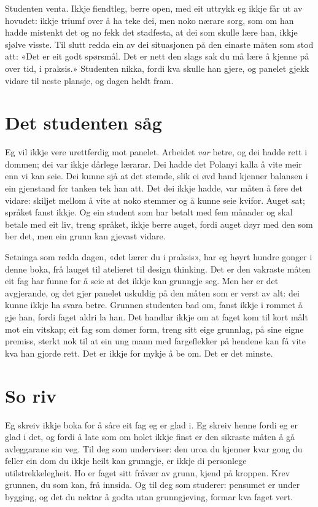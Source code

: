 Studenten venta. Ikkje fiendtleg, berre open, med eit uttrykk eg ikkje får ut av hovudet: ikkje triumf over å ha teke dei, men noko nærare sorg, som om han hadde mistenkt det og no fekk det stadfesta, at dei som skulle lære han, ikkje sjølve visste. Til slutt redda ein av dei situasjonen på den einaste måten som stod att: «Det er eit godt spørsmål. Det er nett den slags sak du må lære å kjenne på over tid, i praksis.» Studenten nikka, fordi kva skulle han gjere, og panelet gjekk vidare til neste plansje, og dagen heldt fram.

\section{Det studenten såg}

Eg vil ikkje vere urettferdig mot panelet. Arbeidet \emph{var} betre, og dei hadde rett i dommen; dei var ikkje dårlege lærarar. Dei hadde det Polanyi kalla å vite meir enn vi kan seie. Dei kunne sjå at det stemde, slik ei øvd hand kjenner balansen i ein gjenstand før tanken tek han att. Det dei ikkje hadde, var måten å føre det vidare: skiljet mellom å vite at noko stemmer og å kunne seie kvifor. Auget sat; språket fanst ikkje. Og ein student som har betalt med fem månader og skal betale med eit liv, treng språket, ikkje berre auget, fordi auget døyr med den som ber det, men ein grunn kan gjevast vidare.

Setninga som redda dagen, «det lærer du i praksis», har eg høyrt hundre gonger i denne boka, frå lauget til atelieret til design thinking. Det er den vakraste måten eit fag har funne for å seie at det ikkje kan grunngje seg. Men her er det avgjerande, og det gjer panelet uskuldig på den måten som er verst av alt: dei kunne ikkje ha svara betre. Grunnen studenten bad om, fanst ikkje i rommet å gje han, fordi faget aldri la han. Det handlar ikkje om at faget kom til kort målt mot ein vitskap; eit fag som dømer form, treng sitt eige grunnlag, på sine eigne premiss, sterkt nok til at ein ung mann med fargeflekker på hendene kan få vite kva han gjorde rett. Det er ikkje for mykje å be om. Det er det minste.

\section{So riv}

Eg skreiv ikkje boka for å såre eit fag eg er glad i. Eg skreiv henne fordi eg er glad i det, og fordi å late som om holet ikkje finst er den sikraste måten å gå avleggarane sin veg. Til deg som underviser: den uroa du kjenner kvar gong du feller ein dom du ikkje heilt kan grunngje, er ikkje di personlege utilstrekkelegheit. Ho er faget sitt fråvær av grunn, kjend på kroppen. Krev grunnen, du som kan, frå innsida. Og til deg som studerer: pensumet er under bygging, og det du nektar å godta utan grunngjeving, formar kva faget vert.

